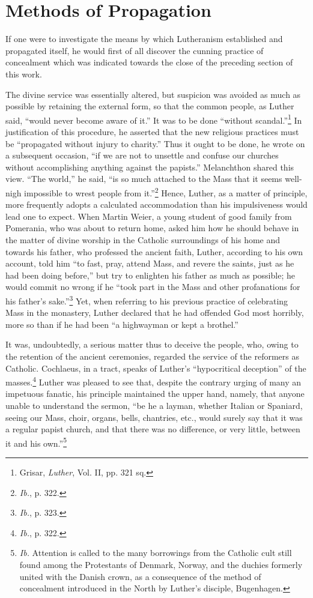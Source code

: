 \section{Methods of Propagation}

If one were to investigate the means by which Lutheranism established and
propagated itself, he would first of all discover the cunning
practice of concealment which was indicated towards the close of the
preceding section of this work.

The divine service was essentially altered, but suspicion was avoided
as much as possible by retaining the external form, so that the common
people, as Luther said, “would never become aware of it.” It was
to be done “without scandal.”\footnote{Grisar, \textit{Luther}, Vol. II, pp. 321 sq.}
In justification of this procedure, he
asserted that the new religious practices must be “propagated without injury
to charity.” Thus it ought to be done, he wrote on a subsequent
occasion, “if we are not to unsettle and confuse our churches
without accomplishing anything against the papists.” Melanchthon
shared this view. “The world,” he said, “is so much attached to the
Mass that it seems well-nigh impossible to wrest people from it.”\footnote{\textit{Ib.}, p. 322.}
Hence, Luther, as a matter of principle, more frequently adopts a
calculated accommodation than his impulsiveness would lead one to
expect. When Martin Weier, a young student of good family from
Pomerania, who was about to return home, asked him how he should
behave in the matter of divine worship in the Catholic surroundings
of his home and towards his father, who professed the ancient faith,
Luther, according to his own account, told him “to fast, pray, attend Mass,
and revere the saints, just as he had been doing before,”
but try to enlighten his father as much as possible; he would commit
no wrong if he “took part in the Mass and other profanations for his
father’s sake.”\footnote{\textit{Ib.}, p. 323.}
Yet, when referring to his previous practice of celebrating
Mass in the monastery, Luther declared that he had offended
God most horribly, more so than if he had been “a highwayman or
kept a brothel.”

It was, undoubtedly, a serious matter thus to deceive the people,
who, owing to the retention of the ancient ceremonies, regarded
the service of the reformers as Catholic. Cochlaeus, in a tract,
speaks of Luther’s “hypocritical deception” of the masses.\footnote{\textit{Ib.}, p. 322.}
Luther
was pleased to see that, despite the contrary urging of many an impetuous
fanatic, his principle maintained the upper hand, namely,
that anyone unable to understand the sermon, “be he a layman,
whether Italian or Spaniard, seeing our Mass, choir, organs, bells,
chantries, etc., would surely say that it was a regular papist church,
and that there was no difference, or very little, between it and his
own.”\footnote{\textit{Ib.} Attention is called to the many borrowings from the Catholic cult still found
among the Protestants of Denmark, Norway, and the duchies formerly united with
the Danish crown, as a consequence of the method of concealment introduced in the North
by Luther’s disciple, Bugenhagen.}

